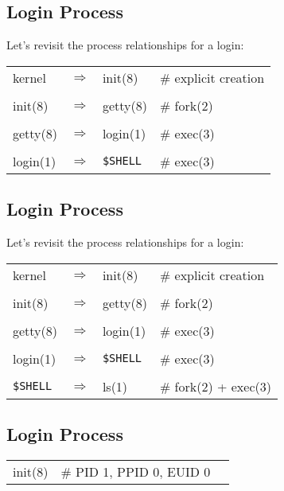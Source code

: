 \documentclass[xga]{xdvislides}
\begin{document}
\subsection{Login Process}
Let's revisit the process relationships for a login:
\vspace*{\fill}
\begin{center}
\begin{tabular}[width=.75\texwidth]{l c l l}
kernel & $\Rightarrow$ & init(8) & \# explicit creation\\
\\
init(8) & $\Rightarrow$ & getty(8) & \# fork(2) \\
\\
getty(8) & $\Rightarrow$ & login(1) & \# exec(3) \\
\\
login(1) & $\Rightarrow$ & \verb+$SHELL+ & \# exec(3) \\
\end{tabular}
\end{center}
\vspace*{\fill}

\subsection{Login Process}
Let's revisit the process relationships for a login:
\vspace*{\fill}
\begin{center}
\begin{tabular}[width=.75\texwidth]{l c l l }
kernel & $\Rightarrow$ & init(8) & \# explicit creation \\
\\
init(8) & $\Rightarrow$ & getty(8) & \# fork(2) \\
\\
getty(8) & $\Rightarrow$ & login(1) & \# exec(3) \\
\\
login(1) & $\Rightarrow$ & \verb+$SHELL+ & \# exec(3) \\
\\
\verb+$SHELL+ & $\Rightarrow$ & ls(1) & \# fork(2) + exec(3) \\
\end{tabular}
\end{center}
\vspace*{\fill}

\subsection{Login Process}
\vspace*{\fill}
\begin{center}
\begin{tabular}[width=.75\texwidth]{l c l}
init(8) & \# PID 1, PPID 0, EUID 0\\
\end{tabular}
\vspace*{\fill}
\end{center}
\end{document}
